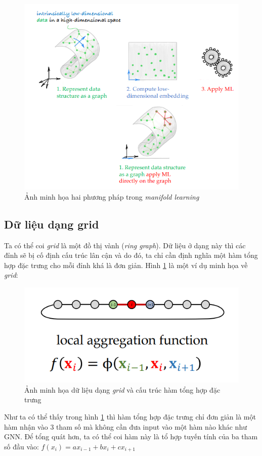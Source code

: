 \begin{figure}[H]
    \centering
    \captionsetup{justification=centering}
    \includegraphics[width=0.7\linewidth]{Images/GDL/graph/manifold.png}
    \caption{Ảnh minh họa hai phương pháp trong \textit{manifold learning}\cite{geometricdeep2022}}
\end{figure}

\subsection{Dữ liệu dạng grid}
Ta có thể coi \textit{grid} là một đồ thị vành (\textit{ring graph})\cite{geometricdeep2022}. Dữ liệu ở dạng này thì các đỉnh sẽ bị cố định cấu trúc lân cận và do đó, ta chỉ cần định nghĩa một hàm tổng hợp đặc trưng cho mỗi đỉnh khá là đơn giản. Hình \ref{fig:grid_ex} là một ví dụ minh họa về \textit{grid}:

\begin{figure}[H]
    \centering
    \captionsetup{justification=centering}
    \includegraphics[width=0.7\linewidth]{Images/GDL/graph/grid_ex.png}
    \caption{Ảnh minh họa dữ liệu dạng \textit{grid} và cấu trúc hàm tổng hợp đặc trưng\cite{geometricdeep2022}}
    \label{fig:grid_ex}
\end{figure}

Như ta có thể thấy trong hình \ref{fig:grid_ex} thì hàm tổng hợp đặc trưng chỉ đơn giản là một hàm nhận vào 3 tham số mà không cần đưa input vào một hàm nào khác như GNN. Để tổng quát hơn, ta có thể coi hàm này là tổ hợp tuyến tính của ba tham số đầu vào: $f(x_i) = a x_{i-1} + b x_{i} + c x_{i+1}$ \cite{geometricdeep2022}

